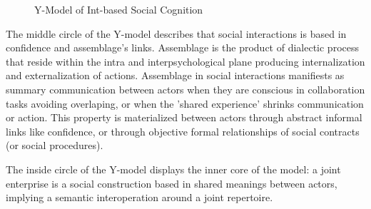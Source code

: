 \documentclass[10pt,twocolumn,ieeetran]{article}
\begin{document}
\begin{figure}[htpb,scale=0.3]
  \caption{Y-Model of Int-based Social Cognition} 
  \label{figure:gajski_kuhn_y_chart__levels_of_abstraction}
\end{figure}


The middle circle of the Y-model describes that social interactions is based in confidence and assemblage's links. Assemblage is the product of dialectic process that reside within the intra and interpsychological plane \cite{Wertsch} producing internalization and externalization of actions. Assemblage in social interactions manifiests as summary communication between actors when they are conscious in collaboration tasks avoiding overlaping, or when the 'shared experience' shrinks communication or action. This property is materialized between actors through abstract informal links like confidence, or through objective formal relationships of social contracts (or social procedures).

The inside circle of the Y-model displays the inner core of the model: a joint enterprise is a social construction based in shared meanings between actors, implying a semantic interoperation around a joint repertoire. 




\end{document}
